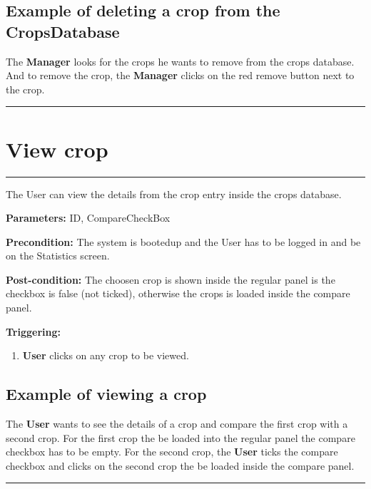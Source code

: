 \subsection{Example of deleting a crop from the CropsDatabase}
The \textbf{Manager} looks for the crops he wants to remove from the crops database. And to remove the crop, the \textbf{Manager} clicks on the red remove button next to the crop.
\hfill
\vspace{0.5cm}
\hrule



\section{View crop}
\hrule
\hfill
\vspace{0.5cm}
\label{operation:View crop}

The User can view the details from the crop entry inside the crops database.

\begin{description}

\item \textbf{Parameters:} ID, CompareCheckBox
\item \textbf{Precondition:} The system is bootedup and the User has to be
logged in and be on the Statistics screen.
\item \textbf{Post-condition:} The choosen crop is shown inside the regular panel is the checkbox is false (not ticked), otherwise the crops is loaded inside the compare panel.
\item \textbf{Triggering:}
\begin{enumerate}

\item \textbf{User} clicks on any crop to be viewed.

\end{enumerate}
\end{description}

\subsection{Example of viewing a crop}
The \textbf{User} wants to see the details of a crop and compare the first crop with a second crop. For the first crop the be loaded into the regular panel the compare checkbox has to be empty. 
For the second crop, the \textbf{User} ticks the compare checkbox and clicks on the second crop the be loaded inside the compare panel.
\hfill
\vspace{0.5cm}
\hrule




